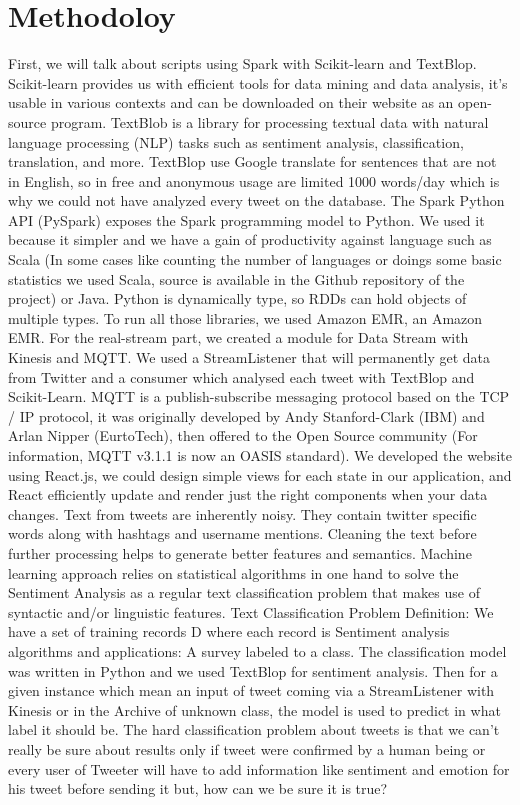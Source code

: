 \documentclass{acmtog} %
\begin{document}
\section{Methodoloy}
\label{sec:methodology}

First, we will talk about scripts using Spark with Scikit-learn and TextBlop. Scikit-learn provides us with efficient tools for data mining and data analysis, it’s usable in various contexts and can be downloaded on their website as an open-source program. TextBlob is a library for processing textual data with natural language processing (NLP) tasks such as sentiment analysis, classification, translation, and more. TextBlop use Google translate for sentences that are not in English, so in free and anonymous usage are limited 1000 words/day which is why we could not have analyzed every tweet on the database. The Spark Python API (PySpark) exposes the Spark programming model to Python. We used it because it simpler and we have a gain of productivity against language such as Scala (In some cases like counting the number of languages or doings some basic statistics we used Scala, source is available in the Github repository of the project) or Java. Python is dynamically type, so RDDs can hold objects of multiple types. To run all those libraries, we used Amazon EMR, an Amazon EMR. For the real-stream part, we created a module for Data Stream with Kinesis and MQTT. We used a StreamListener that will permanently get data from Twitter and a consumer which analysed each tweet with TextBlop and Scikit-Learn.
MQTT is a publish-subscribe messaging protocol based on the TCP / IP protocol, it was originally developed by Andy Stanford-Clark (IBM) and Arlan Nipper (EurtoTech), then offered to the Open Source community (For information, MQTT v3.1.1 is now an OASIS standard). We developed the website using React.js, we could design simple views for each state in our application, and React efficiently update and render just the right components when your data changes. Text from tweets are inherently noisy. They contain twitter specific words along with hashtags and username mentions. Cleaning the text before further processing helps to generate better features and semantics.
Machine learning approach relies on statistical algorithms in one hand to solve the Sentiment Analysis as a regular text classification problem that makes use of syntactic and/or linguistic features. Text Classification Problem Definition: We have a set of training records D where each record is Sentiment analysis algorithms and applications: A survey labeled to a class. The classification model was written in Python and we used TextBlop for sentiment analysis. Then for a given instance which mean an input of tweet coming via a StreamListener with Kinesis or in the Archive of unknown class, the model is used to predict in what label it should be. The hard classification problem about tweets is that we can’t really be sure about results only if tweet were confirmed by a human being or every user of Tweeter will have to add information like sentiment and emotion for his tweet before sending it but, how can we be sure it is true?
\end{document}
